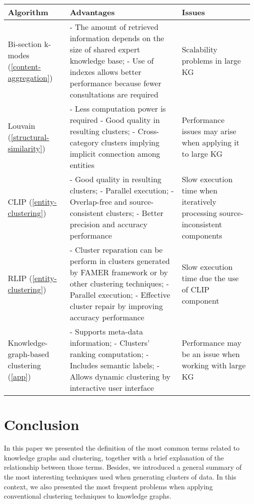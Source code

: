 \documentclass[runningheads]{llncs}
\begin{document}
 \label{table2}
\begin{tabular}{|p{3cm}|p{8.5cm}|p{3.5cm}|}
 \hline
\textbf{Algorithm} & \textbf{Advantages} & \textbf{Issues}\\
 \hline
 Bi-section k-modes (\ref{content-aggregation}) & - The amount of retrieved information depends on the size of shared expert knowledge base; - Use of indexes allows better performance because fewer consultations are required & Scalability problems in large KG \\
 \hline
 Louvain (\ref{structural-similarity}) & - Less computation power is required - Good quality in resulting clusters; - Cross-category clusters implying implicit connection among entities & Performance issues may arise when applying it to large KG \\
 \hline
 CLIP (\ref{entity-clustering}) & - Good quality in resulting clusters; - Parallel execution; - Overlap-free and source-consistent clusters; - Better precision and accuracy performance & Slow execution time when iteratively processing source-inconsistent components \\
 \hline
 RLIP (\ref{entity-clustering}) & - Cluster reparation can be perform in clusters generated by FAMER framework or by other clustering techniques; - Parallel execution; - Effective cluster repair by improving accuracy performance & Slow execution time due the use of CLIP component\\ 
 \hline
 Knowledge-graph-based clustering (\ref{app}) & - Supports meta-data information; - Clusters' ranking computation; - Includes semantic labels; - Allows dynamic clustering by interactive user interface & Performance may be an issue when working with large KG \\
 \hline
\end{tabular}

\section{Conclusion} \label{conclusion}

In this paper we presented the definition of the most common terms related to knowledge graphs and clustering, together with a brief explanation of the relationship between those terms. Besides, we introduced a general summary of the most interesting techniques used when generating clusters of data.
In this context, we also presented the most frequent problems when applying conventional clustering techniques to knowledge graphs. 
\end{document}
